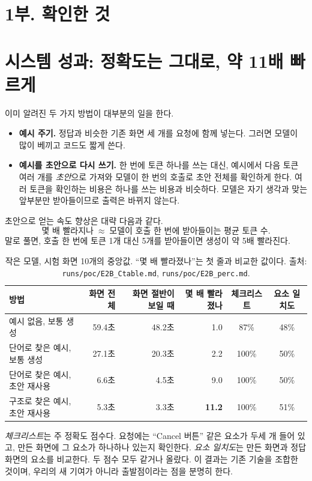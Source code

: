 \documentclass[10pt,a4paper]{article}
\begin{document}
\section*{1부. 확인한 것}

\section{시스템 성과: 정확도는 그대로, 약 11배 빠르게}
이미 알려진 두 가지 방법이 대부분의 일을 한다.
\begin{itemize}[itemsep=1pt]
\item \textbf{예시 주기.} 정답과 비슷한 기존 화면 세 개를 요청에 함께 넣는다. 그러면 모델이 많이 베끼고 코드도 짧게 쓴다.
\item \textbf{예시를 초안으로 다시 쓰기.} 한 번에 토큰 하나를 쓰는 대신, 예시에서 다음 토큰 여러 개를 \emph{초안}으로 가져와 모델이 한 번의 호출로 초안 전체를 확인하게 한다. 여러 토큰을 확인하는 비용은 하나를 쓰는 비용과 비슷하다. 모델은 자기 생각과 맞는 앞부분만 받아들이므로 출력은 바뀌지 않는다.
\end{itemize}
초안으로 얻는 속도 향상은 대략 다음과 같다.
\begin{equation}
\text{몇 배 빨라지나} \;\approx\; \text{모델이 호출 한 번에 받아들이는 평균 토큰 수}.
\end{equation}
말로 풀면, 호출 한 번에 토큰 1개 대신 5개를 받아들이면 생성이 약 5배 빨라진다.

\begin{table}[H]\centering\small
\caption{작은 모델, 시험 화면 10개의 중앙값. ``몇 배 빨라졌나''는 첫 줄과 비교한 값이다. 출처: \texttt{runs/poc/E2B\_Ctable.md}, \texttt{runs/poc/E2B\_perc.md}.}\label{tab:main}
\begin{tabular}{lrrrcc}
\toprule
방법 & 화면 전체 & 화면 절반이 보일 때 & 몇 배 빨라졌나 & 체크리스트 & 요소 일치도\\
\midrule
예시 없음, 보통 생성 & 59.4초 & 48.2초 & 1.0 & 87\% & 48\%\\
단어로 찾은 예시, 보통 생성 & 27.1초 & 20.3초 & 2.2 & 100\% & 50\%\\
단어로 찾은 예시, 초안 재사용 & 6.6초 & 4.5초 & 9.0 & 100\% & 50\%\\
구조로 찾은 예시, 초안 재사용 & 5.3초 & 3.3초 & \textbf{11.2} & 100\% & 51\%\\
\bottomrule
\end{tabular}
\end{table}

\emph{체크리스트}는 주 정확도 점수다. 요청에는 ``Cancel 버튼'' 같은 요소가 두세 개 들어 있고, 만든 화면에 그 요소가 하나하나 있는지 확인한다. \emph{요소 일치도}는 만든 화면과 정답 화면의 요소를 비교한다. 두 점수 모두 같거나 올랐다. 이 결과는 기존 기술을 조합한 것이며, 우리의 새 기여가 아니라 출발점이라는 점을 분명히 한다.
\end{document}
